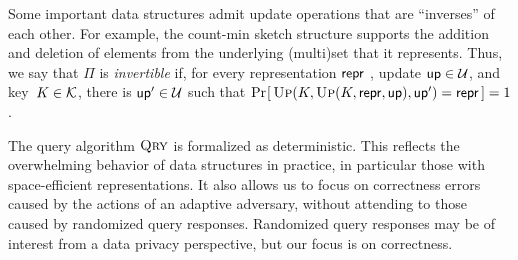 Some important data structures admit update operations that are ``inverses'' of each other.  For example, the count-min sketch structure supports the addition and deletion of elements from the underlying (multi)set that it represents.  Thus, we say that $\Pi$ is {\em invertible} if, for every representation $\mathsf{repr}$ , update $\mathsf{up} \in \mathcal{U}$, and key~$K \in \mathcal{K}$, there is $\mathsf{up}' \in \mathcal{U}$ such that $\Pr\hspace{-1pt}\left[\,\textsc{Up}(K,\textsc{Up}(K,\mathsf{repr},\mathsf{up}),\mathsf{up}') = \mathsf{repr}\,\right] = 1$.  

The query algorithm $\textsc{Qry}$ is formalized as deterministic.  This reflects the overwhelming behavior of data structures in practice, in particular those with space-efficient representations.  It also allows us to focus on correctness errors caused by the actions of an adaptive adversary, without attending to those caused by randomized query responses.  Randomized query responses may be of interest from a data privacy perspective, but our focus is on correctness.




